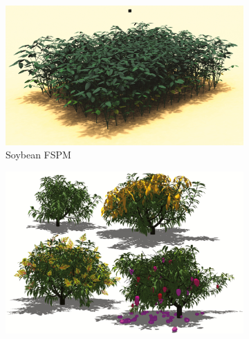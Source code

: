 \begin{figure}[t]
    \centering
    \begin{subfigure}[b]{0.48\linewidth}
        \centering
        \includegraphics[width=\linewidth,height=\linewidth,keepaspectratio]{img/soybean_canopy_coussement.jpeg}
        \caption{Soybean FSPM}
        \label{fig:fspm-soybean-fspm}
    \end{subfigure}
    \hfill
    \begin{subfigure}[b]{0.48\linewidth}
        \centering
        \includegraphics[width=\linewidth,height=\linewidth,keepaspectratio]{img/vmango_example.jpeg}

\end{subfigure}
\end{figure}
